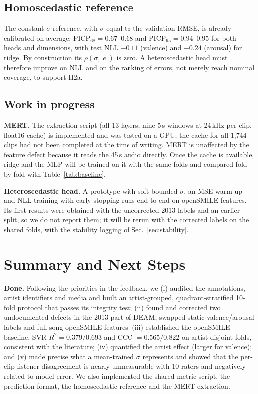 \documentclass[conference]{IEEEtran}
\newcommand{\R}{R^2}
\begin{document}
\subsection{Homoscedastic reference}
The constant-$\sigma$ reference, with $\sigma$ equal to the validation RMSE,
is already calibrated on average: PICP$_{68}=0.67$--$0.68$ and
PICP$_{95}=0.94$--$0.95$ for both heads and dimensions, with test NLL
$-0.11$ (valence) and $-0.24$ (arousal) for ridge. By construction its
$\rho(\sigma,|e|)$ is zero. A heteroscedastic head must therefore improve on
NLL and on the ranking of errors, not merely reach nominal coverage, to
support H2a.

\subsection{Work in progress}
\textbf{MERT.} The extraction script (all 13 layers, nine 5\,s windows at
24\,kHz per clip, float16 cache) is implemented and was tested on a GPU; the
cache for all 1{,}744 clips had not been completed at the time of writing. MERT is unaffected by the
feature defect because it reads the 45\,s audio directly. Once the cache is
available, ridge and the MLP will be trained on it with the same folds and
compared fold by fold with Table~\ref{tab:baseline}.

\textbf{Heteroscedastic head.} A prototype with soft-bounded $\sigma$, an MSE
warm-up and NLL training with early stopping runs end-to-end on openSMILE
features. Its first results were obtained with the uncorrected 2013 labels and
an earlier split, so we do not report them; it will be rerun with the
corrected labels on the shared folds, with the stability logging of
Sec.~\ref{sec:stability}.

\section{Summary and Next Steps}
\label{sec:conclusion}
\textbf{Done.} Following the priorities in the feedback, we (i) audited the
annotations, artist identifiers and media and built an artist-grouped,
quadrant-stratified 10-fold protocol that passes its integrity test;
(ii) found and corrected two undocumented defects in the 2013 part of DEAM,
swapped static valence/arousal labels and full-song openSMILE features;
(iii) established the openSMILE baseline, SVR $\R=0.379/0.693$ and CCC
$=0.565/0.822$ on artist-disjoint folds, consistent with the literature;
(iv) quantified the artist effect (larger for valence); and (v) made precise
what a mean-trained $\sigma$ represents and showed that the per-clip listener
disagreement is nearly unmeasurable with 10 raters and negatively related to
model error. We also implemented the shared metric script, the prediction
format, the homoscedastic reference and the MERT extraction.
\end{document}
